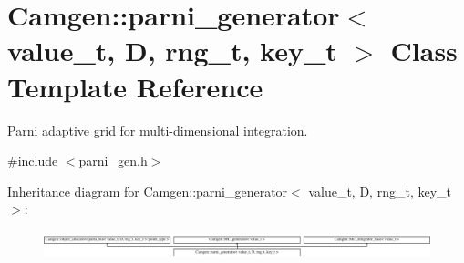 \hypertarget{a00393}{}\section{Camgen\+:\+:parni\+\_\+generator$<$ value\+\_\+t, D, rng\+\_\+t, key\+\_\+t $>$ Class Template Reference}
\label{a00393}


Parni adaptive grid for multi-\/dimensional integration.  




{\ttfamily \#include $<$parni\+\_\+gen.\+h$>$}

Inheritance diagram for Camgen\+:\+:parni\+\_\+generator$<$ value\+\_\+t, D, rng\+\_\+t, key\+\_\+t $>$\+:\begin{figure}[H]
\begin{center}
\leavevmode
\includegraphics[height=0.806336cm]{a00393}
\end{center}
\end{figure}
